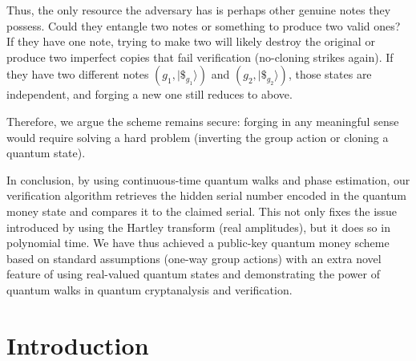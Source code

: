 \documentclass[11pt]{article}
\theoremstyle{definition}
\begin{document}
    Thus, the only resource the adversary has is perhaps other genuine notes they possess. Could they entangle two notes or something to produce two valid ones? If they have one note, trying to make two will likely destroy the original or produce two imperfect copies that fail verification (no-cloning strikes again). If they have two different notes $(g_1, |\$_{g_1}\rangle)$ and $(g_2, |\$_{g_2}\rangle)$, those states are independent, and forging a new one still reduces to above.

    Therefore, we argue the scheme remains secure: forging in any meaningful sense would require solving a hard problem (inverting the group action or cloning a quantum state).

    In conclusion, by using continuous-time quantum walks and phase estimation, our verification algorithm retrieves the hidden serial number encoded in the quantum money state and compares it to the claimed serial. This not only fixes the issue introduced by using the Hartley transform (real amplitudes), but it does so in polynomial time. We have thus achieved a public-key quantum money scheme based on standard assumptions (one-way group actions) with an extra novel feature of using real-valued quantum states and demonstrating the power of quantum walks in quantum cryptanalysis and verification.















\section*{Introduction}
\end{document}

